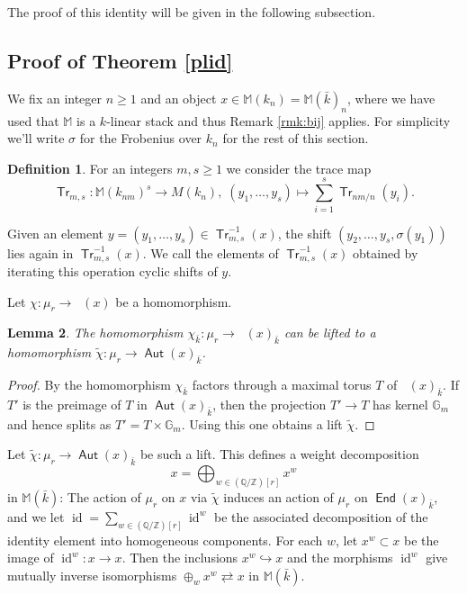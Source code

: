 \documentclass{article}
\DeclareMathOperator{\id}{id}
\DeclareMathOperator{\Aut}{\mathsf{Aut}}
\DeclareMathOperator{\uAut}{\underline{\mathsf{Aut}}}
\DeclareMathOperator{\Tr}{\mathsf{Tr}}
\DeclareMathOperator{\End}{\mathsf{End}}
\newcommand{\BG}{{\mathbb{G}}}
\newcommand{\BM}{{\mathbb{M}}}
\newcommand{\BQ}{{\mathbb{Q}}}
\newcommand{\BZ}{{\mathbb{Z}}}
\let\into\hookrightarrow
\theoremstyle{definition}
\newtheorem{definition}{Definition}[section]
\theoremstyle{plain}
\newtheorem{lemma}[definition]{Lemma}
\begin{document}
The proof of this identity will be given in the following subsection.


\subsection{Proof of Theorem \ref{plid}}
We fix an integer $n\geq 1$ and an object $x \in \BM(k_n)=\BM(\bar{k})_n$, where we have used that $\BM$ is a $k$-linear stack and thus Remark \ref{rmk:bij} applies. For simplicity we'll write $\sigma$ for the Frobenius over $k_n$ for the rest of this section. 
\begin{definition}
    For an integers $m,s \geq 1$ we consider the trace map
    \begin{equation*}
        \Tr_{m,s}\colon \BM(k_{nm})^s \to M(k_n), \; (y_1,\hdots,y_s) \mapsto \sum_{i=1}^s \Tr_{nm/n}(y_i).
    \end{equation*}

    Given an element $y=(y_1,\hdots,y_s) \in \Tr_{m,s}^{-1}(x)$, the shift $(y_2,\hdots,y_s,\sigma(y_1))$ lies again in $\Tr^{-1}_{m,s}(x)$. We call the elements of $\Tr^{-1}_{m,s}(x)$ obtained by iterating this operation cyclic shifts of $y$.
\end{definition}

Let $\chi\colon \mu_r \to \uAut(x)$ be a homomorphism. 

\begin{lemma}
    The homomorphism $\chi_{\bar k}\colon  \mu_r \to \uAut(x)_{\bar k}$ can be lifted to a homomorphism $\tilde\chi\colon  \mu_r \to \Aut(x)_{\bar k}$.
\end{lemma}
\begin{proof}
    By \cite[Prop. 3.15]{Ziegler22} the homomorphism $\chi_{\bar k}$ factors through a maximal torus $T$ of $\uAut(x)_{\bar k}$. If $T'$ is the preimage of $T$ in $\Aut(x)_{\bar k}$, then the projection $T'\to T$ has kernel $\BG_m$ and hence splits as $T'=T \times \BG_m$. Using this one obtains a lift $\tilde\chi$.
\end{proof}
Let $\tilde\chi\colon \mu_r \to \Aut(x)_{\bar k}$ be such a lift. This defines a weight decomposition 
\[x=\bigoplus_{w \in (\BQ/\BZ)[r]} x^w\] in $\BM(\bar k)$: The action of $\mu_r$ on $x$ via $\tilde\chi$ induces an action of $\mu_r$ on $\End(x)_{\bar k}$, and we let $\id=\sum_{w \in (\BQ/\BZ)[r]} \id^w$ be the associated decomposition of the identity element into homogeneous components. For each $w$, let $x^w \subset x$ be the image of $\id^w\colon x \to x$. Then the inclusions $x^w \into x$ and the morphisms $\id^w$ give mutually inverse isomorphisms $\oplus_w x^w \rightleftarrows x$ in $\BM(\bar k)$.
\end{document}
